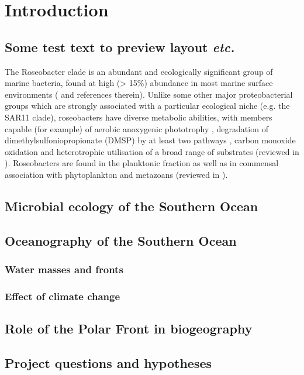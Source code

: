 \chapter{Introduction} 
\label{ch:intro}

\section{Some test text to preview layout \emph{etc.}}
The Roseobacter clade is an abundant and ecologically significant group of marine bacteria, found at high (> 15\%) abundance in most marine surface environments (\citet{Anonymous:2005hd} and references therein). Unlike some other major proteobacterial groups which are strongly associated with a particular ecological niche (e.g. the SAR11 clade), roseobacters have diverse metabolic abilities, with members capable (for example) of aerobic anoxygenic phototrophy \cite{Biebl:2005fp,Anonymous:mYN2Q-VF}, degradation of dimethylsulfoniopropionate (DMSP) by at least two pathways \cite{Anonymous:2007fs,Miller:2004jz}, carbon monoxide oxidation \cite{Anonymous:ltlffvSn} and heterotrophic utilisation of a broad range of substrates (reviewed in \cite{Anonymous:2008do}). Roseobacters are found in the planktonic fraction as well as in commensal association with phytoplankton and metazoans (reviewed in \citet{Anonymous:2005hd}).

\section{Microbial ecology of the Southern Ocean}

\section{Oceanography of the Southern Ocean}
\subsection{Water masses and fronts}
\subsection{Effect of climate change}

\section{Role of the Polar Front in biogeography}
\section{Project questions and hypotheses}

